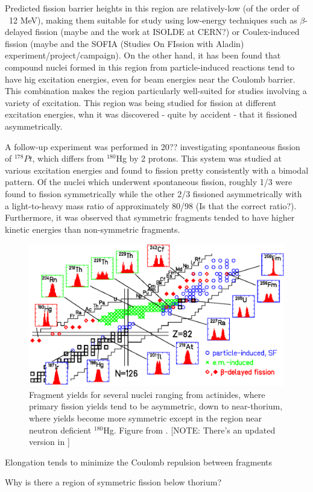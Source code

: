 Predicted fission barrier heights in this region are relatively-low (of the order of ~12 MeV), making them suitable for study using low-energy techniques such as $\beta$-delayed fission (maybe \cite{Andreyev2013} and the work at ISOLDE at CERN?) or Coulex-induced fission (maybe \cite{Martin2015} and the SOFIA (Studies On FIssion with Aladin) experiment/project/campaign). On the other hand, it has been found that compound nuclei formed in this region from particle-induced reactions tend to have hig excitation energies, even for beam energies near the Coulomb barrier. This combination makes the region particularly well-suited for studies involving a variety of excitation. This region was being studied for fission at different excitation energies, whn it was discovered - quite by accident - that it fissioned asymmetrically.

A follow-up experiment was performed in 20?? \cite{our-Pt-paper} investigating spontaneous fission of $^{178}Pt$, which differs from $^{180}$Hg by 2 protons. This system was studied at various excitation energies and found to fission pretty consistently with a bimodal pattern. Of the nuclei which underwent spontaneous fission, roughly 1/3 were found to fission symmetrically while the other 2/3 fissioned asymmetrically with a light-to-heavy mass ratio of approximately 80/98 (Is that the correct ratio?). Furthermore, it was observed that symmetric fragments tended to have higher kinetic energies than non-symmetric fragments. 

\begin{figure}
	\includegraphics[width=0.9\linewidth]{./TeX_files/with180Hg}
	\caption[Short]{Fragment yields for several nuclei ranging from actinides, where primary fission yields tend to be asymmetric, down to near-thorium, where yields become more symmetric except in the region near neutron deficient $^{180}$Hg. Figure from \cite{Andreyev2010}. [NOTE: There's an updated version in \cite{Andreyev2018}]}
	\label{fig:with180hg}
\end{figure}

Elongation tends to minimize the Coulomb repulsion between fragments

Why is there a region of symmetric fission below thorium?